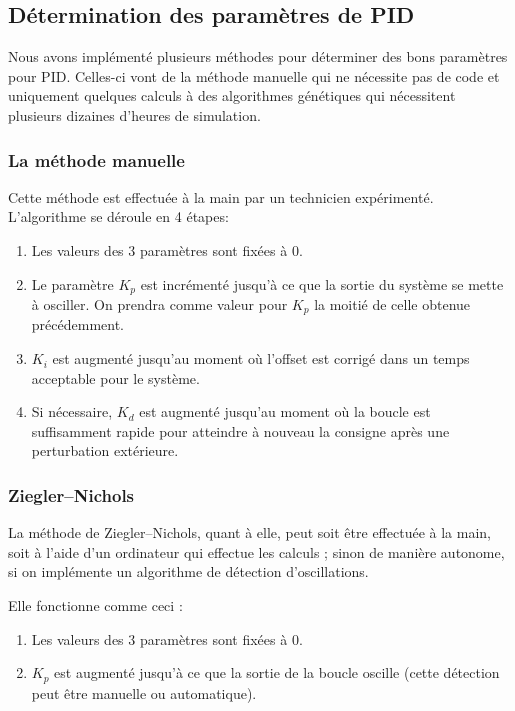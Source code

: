 \documentclass[a4paper,10pt]{report}
\begin{document}
\subsection{Détermination des paramètres de PID}

Nous avons implémenté plusieurs méthodes pour déterminer des bons paramètres pour PID. Celles-ci vont de la méthode manuelle qui ne nécessite pas de code et uniquement quelques calculs à des algorithmes génétiques qui nécessitent plusieurs dizaines d'heures de simulation.

\subsubsection{La méthode manuelle}

Cette méthode est effectuée à la main par un technicien expérimenté.
L'algorithme se déroule en 4 étapes:
\begin{enumerate}
    \item Les valeurs des 3 paramètres sont fixées à $0$.
    \item Le paramètre $K_p$ est incrémenté jusqu'à ce que la sortie du système se mette à osciller.
    On prendra comme valeur pour $K_p$ la moitié de celle obtenue précédemment.
    \item $K_i$ est augmenté jusqu'au moment où l'offset est corrigé dans un temps acceptable pour le système.
    \item Si nécessaire, $K_d$ est augmenté jusqu'au moment où la boucle est suffisamment rapide pour atteindre à nouveau la consigne après une perturbation extérieure.
\end{enumerate}

\subsubsection{Ziegler–Nichols}
La méthode de Ziegler–Nichols, quant à elle, peut soit être effectuée à la main, soit à l'aide d'un ordinateur qui effectue les calculs ; sinon de manière autonome, si on implémente un algorithme de détection d'oscillations.

Elle fonctionne comme ceci :
\begin{enumerate}
    \item Les valeurs des 3 paramètres sont fixées à $0$.
    \item $K_p$ est augmenté jusqu'à ce que la sortie de la boucle oscille (cette détection peut être manuelle ou automatique).
\end{enumerate}
\end{document}
